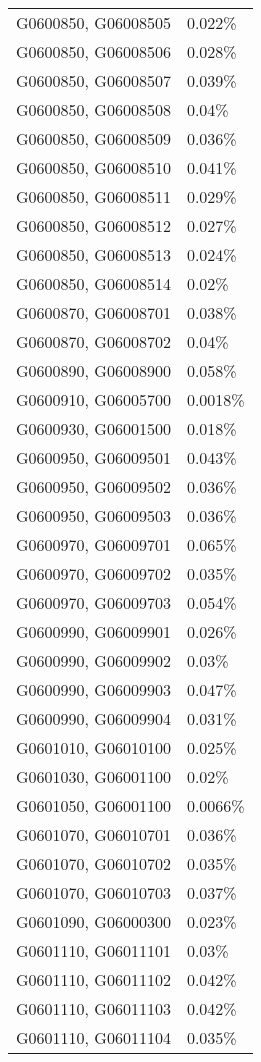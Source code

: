 \begin{longtable}[]{@{}ll@{}}
G0600850, G06008505 & 0.022\% \\
G0600850, G06008506 & 0.028\% \\
G0600850, G06008507 & 0.039\% \\
G0600850, G06008508 & 0.04\% \\
G0600850, G06008509 & 0.036\% \\
G0600850, G06008510 & 0.041\% \\
G0600850, G06008511 & 0.029\% \\
G0600850, G06008512 & 0.027\% \\
G0600850, G06008513 & 0.024\% \\
G0600850, G06008514 & 0.02\% \\
G0600870, G06008701 & 0.038\% \\
G0600870, G06008702 & 0.04\% \\
G0600890, G06008900 & 0.058\% \\
G0600910, G06005700 & 0.0018\% \\
G0600930, G06001500 & 0.018\% \\
G0600950, G06009501 & 0.043\% \\
G0600950, G06009502 & 0.036\% \\
G0600950, G06009503 & 0.036\% \\
G0600970, G06009701 & 0.065\% \\
G0600970, G06009702 & 0.035\% \\
G0600970, G06009703 & 0.054\% \\
G0600990, G06009901 & 0.026\% \\
G0600990, G06009902 & 0.03\% \\
G0600990, G06009903 & 0.047\% \\
G0600990, G06009904 & 0.031\% \\
G0601010, G06010100 & 0.025\% \\
G0601030, G06001100 & 0.02\% \\
G0601050, G06001100 & 0.0066\% \\
G0601070, G06010701 & 0.036\% \\
G0601070, G06010702 & 0.035\% \\
G0601070, G06010703 & 0.037\% \\
G0601090, G06000300 & 0.023\% \\
G0601110, G06011101 & 0.03\% \\
G0601110, G06011102 & 0.042\% \\
G0601110, G06011103 & 0.042\% \\
G0601110, G06011104 & 0.035\% \\

\end{longtable}
